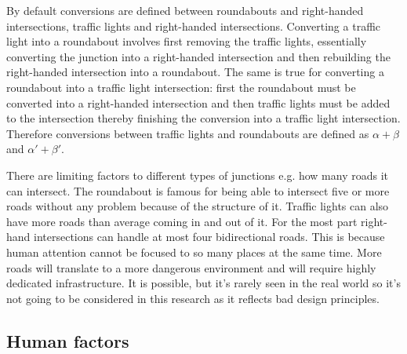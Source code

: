\documentclass[
]{elteikthesis}[2023/04/10]
\begin{document}
By default conversions are defined between roundabouts and right-handed
intersections, traffic lights and right-handed intersections. Converting
a traffic light into a roundabout involves first removing the traffic
lights, essentially converting the junction into a right-handed intersection
and then rebuilding the right-handed intersection into a roundabout.
The same is true for converting a roundabout into a traffic light
intersection: first the roundabout must be converted into a right-handed
intersection and then traffic lights must be added to the intersection
thereby finishing the conversion into a traffic light intersection.
Therefore conversions between traffic lights and roundabouts are defined
as $\alpha+\beta$ and $\alpha\prime+\beta\prime$.

There are limiting factors to different types of junctions e.g. how
many roads it can intersect. The roundabout is famous for being able
to intersect five or more roads without any problem because of the
structure of it. Traffic lights can also have more roads than average
coming in and out of it. For the most part right-hand intersections
can handle at most four bidirectional roads. This is because human
attention cannot be focused to so many places at the same time. More
roads will translate to a more dangerous environment and will require
highly dedicated infrastructure. It is possible, but it's rarely seen
in the real world so it's not going to be considered in this research
as it reflects bad design principles. 

\subsection{Human factors}
\end{document}
